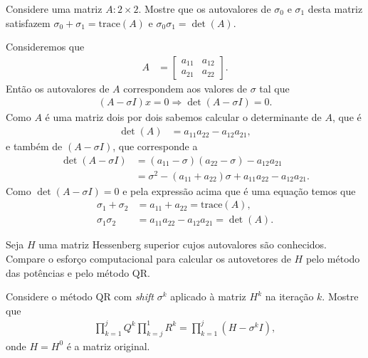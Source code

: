 \documentclass[a4paper,12pt, leqno, answers]{exam}
\begin{document}
\begin{questions}
    \question Considere uma matriz $A : 2 \times 2$. Mostre que os autovalores de $\sigma_0$ e $\sigma_1$ desta matriz satisfazem $\sigma_0 + \sigma_1 = \mathrm{trace}(A)$ e $\sigma_0 \sigma_1 = \det(A)$.
    \begin{solution}
        Consideremos que
        \begin{align*}
            A &= \begin{bmatrix}
                a_{11} & a_{12} \\
                a_{21} & a_{22}
            \end{bmatrix}.
        \end{align*}
        Ent\~{a}o os autovalores de $A$ correspondem aos valores de $\sigma$ tal que
        \begin{align*}
            (A - \sigma I) x = 0 \Rightarrow \det(A - \sigma I) = 0.
        \end{align*}
        Como $A$ \'{e} uma matriz dois por dois sabemos calcular o determinante de $A$, que \'{e}
        \begin{align*}
            \det(A) &= a_{11} a_{22} - a_{12} a_{21},
        \end{align*}
        e tamb\'{e}m de $(A - \sigma I)$, que corresponde a
        \begin{align*}
            \det(A - \sigma I) &= (a_{11} - \sigma) (a_{22} - \sigma) - a_{12} a_{21} \\
            &= \sigma^2 - (a_{11} + a_{22}) \sigma + a_{11} a_{22} - a_{12} a_{21}.
        \end{align*}
        Como $\det(A - \sigma I) = 0$ e pela express\~{a}o acima que \'{e} uma equa\c{c}\~{a}o temos que
        \begin{align*}
            \sigma_1 + \sigma_2 &= a_{11} + a_{22} = \mathrm{trace}(A), \\
            \sigma_1 \sigma_2 &= a_{11} a_{22} - a_{12} a_{21} = \det(A).
        \end{align*}
    \end{solution}
    
    \question Seja $H$ uma matriz Hessenberg superior cujos autovalores s\~{a}o conhecidos. Compare o esfor\c{c}o computacional para calcular os autovetores de $H$ pelo m\'{e}todo das pot\^{e}ncias e pelo m\'{e}todo QR.
    \begin{solution}
    \end{solution}

    \question Considere o m\'{e}todo QR com \textit{shift} $\sigma^k$ aplicado \`{a} matriz $H^k$ na itera\c{c}\~{a}o $k$. Mostre que
    \begin{align*}
        \prod_{k = 1}^j Q^k \prod_{k = j}^1 R^k = \prod_{k = 1}^j \left( H - \sigma^k I \right),
    \end{align*}
    onde $H = H^0$ \'{e} a matriz original.
    \begin{solution}
    \end{solution}
\end{questions}


\end{document}
